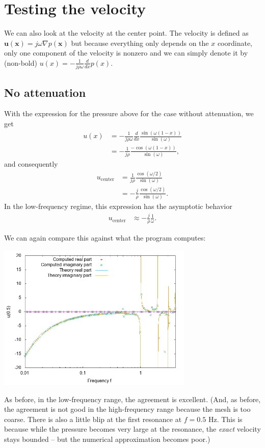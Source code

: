 \documentclass{article}
\begin{document}
\section{Testing the velocity}

We can also look at the velocity at the center point. The velocity is
defined as $\mathbf u(\mathbf x)=j\omega \nabla p(\mathbf x)$ but
because everything only depends on the $x$ coordinate, only one
component of the velocity is nonzero and we can simply denote it by
(non-bold) $u(x)=-\frac{1}{j\rho\omega}\frac{d}{dx} p(x)$.

\subsection{No attenuation}

With the expression for the pressure above for the case without
attenuation, we get
\begin{align*}
  u(x)
  &=
  -\frac{1}{j\rho\omega} \frac{d}{dx} \frac{\sin(\omega(1-x))}{\sin(\omega)}
  \\
  &=
  -\frac{1}{j\rho} \frac{-\cos(\omega(1-x))}{\sin(\omega)},
\end{align*}
and consequently
\begin{align*}
  u_\text{center}
  &=
  \frac{1}{j\rho} \frac{\cos(\omega/2)}{\sin(\omega)}
  \\
  &=
  -\frac{j}{\rho} \frac{\cos(\omega/2)}{\sin(\omega)}.
\end{align*}
In the low-frequency regime, this expression has the asymptotic behavior
\begin{align*}
  u_\text{center}
  &\approx
  -\frac{j}{\rho} \frac{1}{\omega}.
\end{align*}


We can again compare this against what the program computes:
\begin{center}
\includegraphics[width=0.7\textwidth]{no-attenuation/velocity-at-center.png}
\end{center}
As before, in the low-frequency range, the agreement is
excellent. (And, as before, the agreement is not good in the
high-frequency range because the mesh is too coarse. There is also a
little blip at the first resonance at $f=0.5$ Hz. This is because
while the pressure becomes very large at the resonance, the
\textit{exact} velocity stays bounded -- but the numerical
approximation becomes poor.)
\end{document}
